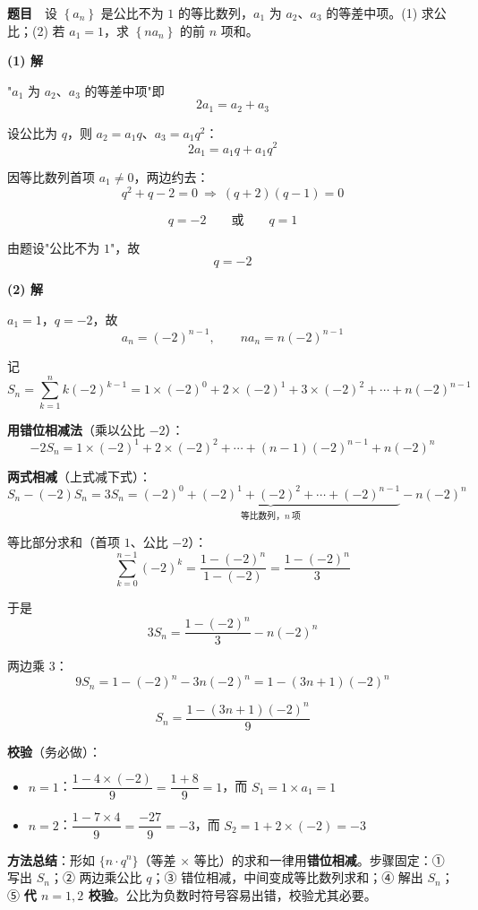 \textbf{题目}　设 $\left\{a_n\right\}$ 是公比不为 $1$ 的等比数列，$a_1$ 为 $a_2$、$a_3$ 的等差中项。(1) 求公比；(2) 若 $a_1=1$，求 $\left\{na_n\right\}$ 的前 $n$ 项和。

\par\medskip

\textbf{(1) 解}

"$a_1$ 为 $a_2$、$a_3$ 的等差中项"即
\[2a_1=a_2+a_3\]

设公比为 $q$，则 $a_2=a_1q$、$a_3=a_1q^{2}$：
\[2a_1=a_1q+a_1q^{2}\]

因等比数列首项 $a_1\ne0$，两边约去：
\[q^{2}+q-2=0\ \Longrightarrow\ (q+2)(q-1)=0\]

\[q=-2\qquad\text{或}\qquad q=1\]

由题设"公比不为 $1$"，故
\[q=-2\]

\par\medskip

\textbf{(2) 解}

$a_1=1$，$q=-2$，故
\[a_n=(-2)^{n-1},\qquad na_n=n(-2)^{n-1}\]

记
\[S_n=\sum_{k=1}^{n}k(-2)^{k-1}=1\times(-2)^{0}+2\times(-2)^{1}+3\times(-2)^{2}+\cdots+n(-2)^{n-1}\]

\textbf{用错位相减法}（乘以公比 $-2$）：
\[-2S_n=1\times(-2)^{1}+2\times(-2)^{2}+\cdots+(n-1)(-2)^{n-1}+n(-2)^{n}\]

\textbf{两式相减}（上式减下式）：
\[S_n-(-2)S_n=3S_n=\underbrace{(-2)^{0}+(-2)^{1}+(-2)^{2}+\cdots+(-2)^{n-1}}_{\text{等比数列，}n\ \text{项}}-n(-2)^{n}\]

等比部分求和（首项 $1$、公比 $-2$）：
\[\sum_{k=0}^{n-1}(-2)^{k}=\frac{1-(-2)^{n}}{1-(-2)}=\frac{1-(-2)^{n}}3\]

于是
\[3S_n=\frac{1-(-2)^{n}}3-n(-2)^{n}\]

两边乘 $3$：
\[9S_n=1-(-2)^{n}-3n(-2)^{n}=1-(3n+1)(-2)^{n}\]

\[\boxed{S_n=\frac{1-(3n+1)(-2)^{n}}9}\]

\textbf{校验}（务必做）：
\begin{itemize}
\item $n=1$：$\dfrac{1-4\times(-2)}9=\dfrac{1+8}9=1$，而 $S_1=1\times a_1=1$ 
\item $n=2$：$\dfrac{1-7\times4}9=\dfrac{-27}9=-3$，而 $S_2=1+2\times(-2)=-3$ 
\end{itemize}

\begin{gktip}
\textbf{方法总结}：形如 $\{n\cdot q^{n}\}$（等差 × 等比）的求和一律用\textbf{错位相减}。步骤固定：① 写出 $S_n$；② 两边乘公比 $q$；③ 错位相减，中间变成等比数列求和；④ 解出 $S_n$；⑤ \textbf{代 $n=1,2$ 校验}。公比为负数时符号容易出错，校验尤其必要。
\end{gktip}

